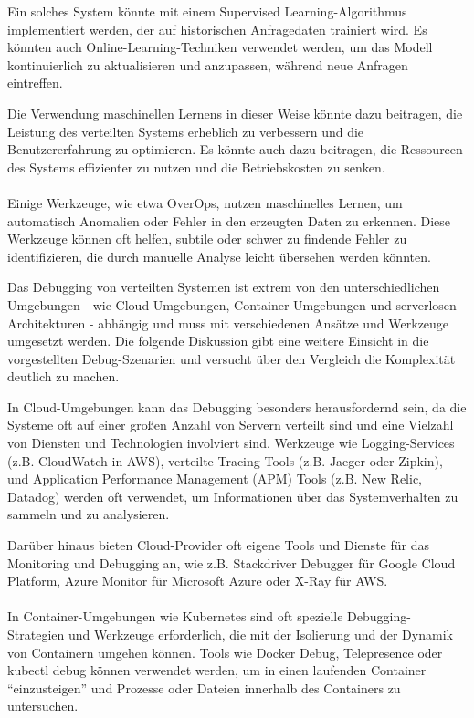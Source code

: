 Ein solches System könnte mit einem Supervised Learning-Algorithmus implementiert werden, der auf historischen Anfragedaten trainiert wird. Es könnten auch Online-Learning-Techniken verwendet werden, um das Modell kontinuierlich zu aktualisieren und anzupassen, während neue Anfragen eintreffen.

Die Verwendung maschinellen Lernens in dieser Weise könnte dazu beitragen, die Leistung des verteilten Systems erheblich zu verbessern und die Benutzererfahrung zu optimieren. Es könnte auch dazu beitragen, die Ressourcen des Systems effizienter zu nutzen und die Betriebskosten zu senken.
\\\\
Einige Werkzeuge, wie etwa OverOps, nutzen maschinelles Lernen, um automatisch Anomalien oder Fehler in den erzeugten Daten zu erkennen. Diese Werkzeuge können oft helfen, subtile oder schwer zu findende Fehler zu identifizieren, die durch manuelle Analyse leicht übersehen werden könnten.

Das Debugging von verteilten Systemen ist extrem von den unterschiedlichen Umgebungen - wie Cloud-Umgebungen, Container-Umgebungen und serverlosen Architekturen - abhängig und muss mit verschiedenen Ansätze und Werkzeuge umgesetzt werden. Die folgende Diskussion gibt eine weitere Einsicht in die vorgestellten Debug-Szenarien und versucht über den Vergleich die Komplexität deutlich zu machen. 

In Cloud-Umgebungen kann das Debugging besonders herausfordernd sein, da die Systeme oft auf einer großen Anzahl von Servern verteilt sind und eine Vielzahl von Diensten und Technologien involviert sind. Werkzeuge wie Logging-Services (z.B. CloudWatch in AWS), verteilte Tracing-Tools (z.B. Jaeger oder Zipkin), und Application Performance Management (APM) Tools (z.B. New Relic, Datadog) werden oft verwendet, um Informationen über das Systemverhalten zu sammeln und zu analysieren.

Darüber hinaus bieten Cloud-Provider oft eigene Tools und Dienste für das Monitoring und Debugging an, wie z.B. Stackdriver Debugger für Google Cloud Platform, Azure Monitor für Microsoft Azure oder X-Ray für AWS.
\\\\
In Container-Umgebungen wie Kubernetes sind oft spezielle Debugging-Strategien und Werkzeuge erforderlich, die mit der Isolierung und der Dynamik von Containern umgehen können. Tools wie Docker Debug, Telepresence oder kubectl debug können verwendet werden, um in einen laufenden Container \enquote{einzusteigen} und Prozesse oder Dateien innerhalb des Containers zu untersuchen.

